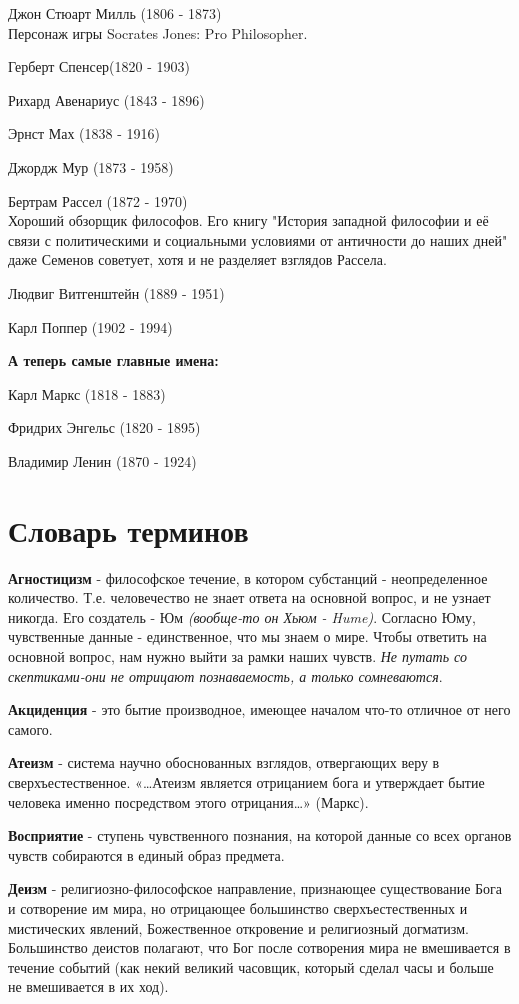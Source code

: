 \documentclass[12pt,a4paper]{article}
\begin{document}
Джон Стюарт Милль (1806 - 1873)\\
Персонаж игры Socrates Jones: Pro Philosopher.

Герберт Спенсер(1820 - 1903)

Рихард Авенариус (1843 - 1896)

Эрнст Мах (1838 - 1916)

Джордж Мур (1873 - 1958)

Бертрам Рассел (1872 - 1970)\\
Хороший обзорщик философов. Его книгу "История западной философии и её связи с политическими и социальными условиями от античности до наших дней" даже Семенов советует, хотя и не разделяет взглядов Рассела.

Людвиг Витгенштейн (1889 - 1951)

Карл Поппер (1902 - 1994)

\textbf{А теперь самые главные имена:}

Карл Маркс (1818 - 1883)

Фридрих Энгельс (1820 - 1895)

Владимир Ленин (1870 - 1924)


\section{Словарь терминов}
\textbf{Агностицизм} - философское течение, в котором субстанций - неопределенное количество. Т.е. человечество не знает ответа на основной вопрос, и не узнает никогда. Его создатель - Юм \textit{(вообще-то он Хьюм - Hume)}. Согласно Юму, чувственные данные - единственное, что мы знаем о мире. Чтобы ответить на основной вопрос, нам нужно выйти за рамки наших чувств. \textit{Не путать со скептиками-они не отрицают познаваемость, а только сомневаются}.

\textbf{Акциденция} - это бытие производное, имеющее началом что-то отличное от него самого.

\textbf{Атеизм} -  система научно обоснованных взглядов, отвергающих веру в сверхъестественное. «…Атеизм является отрицанием бога и утверждает бытие человека именно посредством этого отрицания…» (Маркс).

\textbf{Восприятие} - ступень чувственного познания, на которой данные со всех органов чувств собираются в единый образ предмета.

\textbf{Деизм} -  религиозно-философское направление, признающее существование Бога и сотворение им мира, но отрицающее большинство сверхъестественных и мистических явлений, Божественное откровение и религиозный догматизм. Большинство деистов полагают, что Бог после сотворения мира не вмешивается в течение событий (как некий великий часовщик, который сделал часы и больше не вмешивается в их ход).
\end{document}
